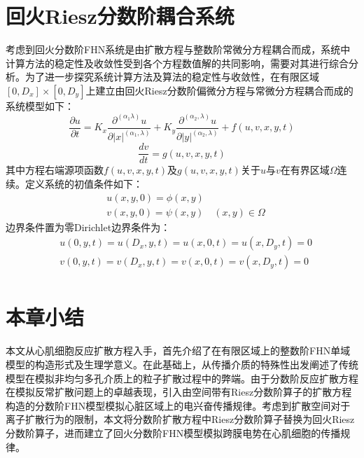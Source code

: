 \documentclass[twoside,UTF8]{nputhesis}
\begin{document}
\section{回火Riesz分数阶耦合系统}
考虑到回火分数阶FHN系统是由扩散方程与整数阶常微分方程耦合而成，系统中计算方法的稳定性及收敛性受到各个方程数值解的共同影响，需要对其进行综合分析。为了进一步探究系统计算方法及算法的稳定性与收敛性，在有限区域$[0,D_{x}]\times[0,D_{y}]$上建立由回火Riesz分数阶偏微分方程与常微分方程耦合而成的系统模型如下：
\begin{equation}
\frac{\partial u}{\partial t}=K_{x} \frac{\partial^{\left(\alpha_{1} \lambda\right)} u}{\partial|x|^{\left(\alpha_{1}, \lambda\right)}}+K_{y} \frac{\partial^{\left(\alpha_{2}, \lambda\right)} u}{\partial|y|^{\left(\alpha_{2}, \lambda\right)}}+f(u, v,x,y,t)
\end{equation}
\begin{equation}
\frac{d v}{d t}=g(u,v,x,y,t)
\end{equation}
其中方程右端源项函数$f(u,v,x,y,t)$及$g(u,v,x,y,t)$关于$u$与$v$在有界区域$\Omega$连续。定义系统的初值条件如下：
\begin{equation}
\begin{aligned}
&u(x, y, 0)=\phi(x, y)\\
&v(x, y, 0)=\psi(x, y)\quad(x, y) \in \Omega
\end{aligned}
\end{equation}
边界条件置为零Dirichlet边界条件为：
\begin{equation}
\begin{aligned}
&u(0, y, t)=u\left(D_{x}, y, t\right)=u(x, 0, t)=u\left(x, D_{y}, t\right)=0\\
&v(0, y, t)=v\left(D_{x}, y, t\right)=v(x, 0, t)=v\left(x, D_{y}, t\right)=0\\
\end{aligned}
\end{equation}






\section{本章小结}
本文从心肌细胞反应扩散方程入手，首先介绍了在有限区域上的整数阶FHN单域模型的构造形式及生理学意义。在此基础上，从传播介质的特殊性出发阐述了传统模型在模拟非均匀多孔介质上的粒子扩散过程中的弊端。由于分数阶反应扩散方程在模拟反常扩散问题上的卓越表现，引入由空间带有Riesz分数阶算子的扩散方程构造的分数阶FHN模型模拟心脏区域上的电兴奋传播规律。考虑到扩散空间对于离子扩散行为的限制，本文将分数阶扩散方程中Riesz分数阶算子替换为回火Riesz分数阶算子，进而建立了回火分数阶FHN模型模拟跨膜电势在心肌细胞的传播规律。
\end{document}
